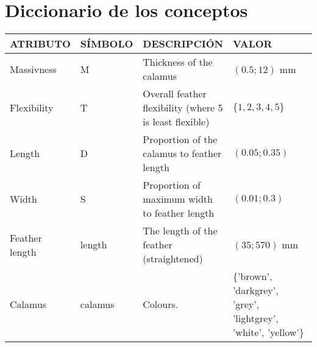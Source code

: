 \documentclass[a4paper,12pt]{article}
\begin{document}
\section{Diccionario de los conceptos}
\begin{table}[H]
	\centering
	\begin{tabular}{|p{0.2\linewidth}|p{0.15\linewidth}|p{0.25\linewidth}|p{0.4\linewidth}|}
		\hline
		ATRIBUTO       & SÍMBOLO      & DESCRIPCIÓN                                   & VALOR                                                                                                                                                                                                                           \\ \hline\hline
		Massivness     & M            & Thickness of the calamus                      & $(0.5;12)$ mm                                                                                                                                                                                                                 \\ \hline
		Flexibility    & T            & Overall feather flexibility (where 5 is least flexible)             & $\{1,2,3,4,5\}$                                                                                                                                                                                                                 \\ \hline
		Length         & D            & Proportion of the calamus to feather length   & $(0.05;0.35)$                                                                                                                                                                                                                     \\ \hline
		Width          & S            & Proportion of maximum width to feather length & $(0.01;0.3)$                                                                                                                                                                                                                     \\ \hline
		Feather length & length       & The length of the feather (straightened)      & $(35;570)$ mm                                                                                                                                                                                                                   \\ \hline
		Calamus        & calamus      & Colours.                                      & \small \{'brown', 'darkgrey', 'grey', 'lightgrey', 'white', 'yellow'\}                                                                                                                                                                 \\ \hline

\end{tabular}
\end{table}
\end{document}
